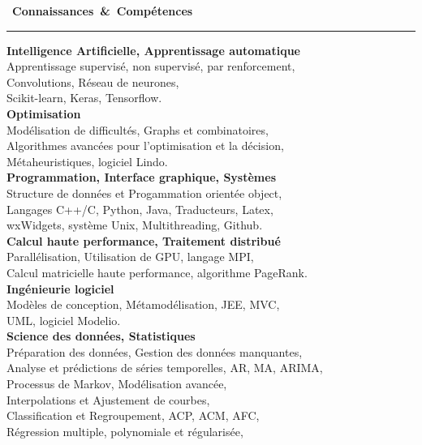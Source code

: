 \documentclass[a4paper]{article}
\begin{document}
\begin{titlepage}
\mbox{\Large \comfortaa \textbf{ \faToolbox \hspace{0.2cm} Connaissances \& Comp\'{e}tences}}\\
\rule{0.8\linewidth}{0.01mm}
\begin{multicols}{2}
\textbf{Intelligence Artificielle, Apprentissage automatique}\\
Apprentissage supervis\'{e}, non supervis\'{e}, par renforcement,\\
Convolutions, R\'{e}seau de neurones,\\
Scikit-learn, Keras, Tensorflow.\\[0.2cm]
\textbf{Optimisation}\\
Mod\'{e}lisation de difficult\'{e}s, Graphs et combinatoires,\\
Algorithmes avanc\'{e}es pour l'optimisation et la d\'{e}cision,\\
M\'{e}taheuristiques, logiciel Lindo.\\[0.2cm]
\textbf{Programmation, Interface graphique, Syst\`{e}mes}\\
Structure de donn\'{e}es et Progammation orient\'{e}e object,\\
Langages C++/C, Python, Java, Traducteurs, Latex,\\
wxWidgets, syst\`{e}me Unix, Multithreading, Github.\\[0.2cm]
\textbf{Calcul haute performance, Traitement distribu\'{e}}\\
Parall\'{e}lisation, Utilisation de GPU, langage MPI,\\
Calcul matricielle haute performance, algorithme PageRank.\\[0.2cm]
\textbf{Ing\'{e}nieurie logiciel}\\
Mod\`{e}les de conception, M\'{e}tamod\'{e}lisation, JEE, MVC,\\
UML, logiciel Modelio.\\[0.2cm]
\textbf{Science des donn\'{e}es, Statistiques}\\
Pr\'{e}paration des donn\'{e}es, Gestion des donn\'{e}es manquantes,\\
Analyse et pr\'{e}dictions de s\'{e}ries temporelles, AR, MA, ARIMA,\\
Processus de Markov, Mod\'{e}lisation avanc\'{e}e,\\
Interpolations et Ajustement de courbes,\\
Classification et Regroupement, ACP, ACM, AFC,\\
R\'{e}gression multiple, polynomiale et r\'{e}gularis\'{e}e,\\

\end{multicols}
\end{titlepage}
\end{document}
